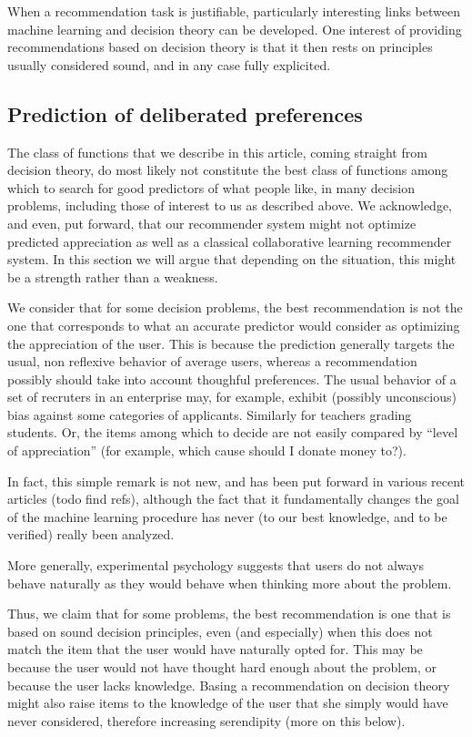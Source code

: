 \documentclass[version=last, pagesize, twoside=off, bibliography=totoc, DIV=calc, fontsize=14pt, a4paper, french, english]{scrartcl}
\begin{document}
When a recommendation task is justifiable, particularly interesting links between machine learning and decision theory can be developed. 
One interest of providing recommendations based on decision theory is that it then rests on principles usually considered sound, and in any case fully explicited.

\subsection{Prediction of deliberated preferences}
The class of functions that we describe in this article, coming straight from decision theory, do most likely not constitute the best class of functions among which to search for good predictors of what people like, in many decision problems, including those of interest to us as described above. We acknowledge, and even, put forward, that our recommender system might not optimize predicted appreciation as well as a classical collaborative learning recommender system.
In this section we will argue that depending on the situation, this might be a strength rather than a weakness.

We consider that for some decision problems, the best recommendation is not the one that corresponds to what an accurate predictor would consider as optimizing the appreciation of the user. This is because the prediction generally targets the usual, non reflexive behavior of average users, whereas a recommendation possibly should take into account thoughful preferences. The usual behavior of a set of recruters in an enterprise may, for example, exhibit (possibly unconscious) bias against some categories of applicants. Similarly for teachers grading students. Or, the items among which to decide are not easily compared by “level of appreciation” (for example, which cause should I donate money to?).

In fact, this simple remark is not new, and has been put forward in various recent articles (todo find refs), although the fact that it fundamentally changes the goal of the machine learning procedure has never (to our best knowledge, and to be verified) really been analyzed.

More generally, experimental psychology suggests that users do not always behave naturally as they would behave when thinking more about the problem.

Thus, we claim that for some problems, the best recommendation is one that is based on sound decision principles, even (and especially) when this does not match the item that the user would have naturally opted for. This may be because the user would not have thought hard enough about the problem, or because the user lacks knowledge. Basing a recommendation on decision theory might also raise items to the knowledge of the user that she simply would have never considered, therefore increasing serendipity (more on this below).
\end{document}
